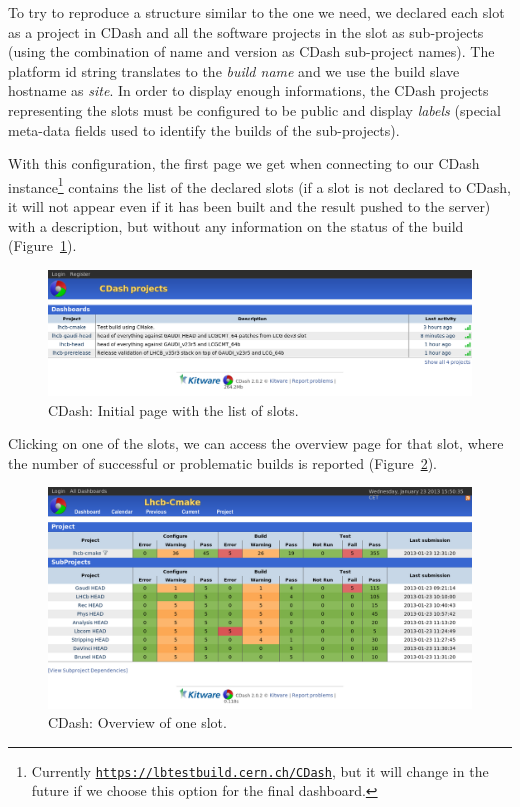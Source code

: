 \documentclass{lhcbnote}
\newcommand{\link}[2]{\href{#1}{#2}}
\newcommand{\urlLink}[1]{\link{#1}{\texttt{#1}}}
\begin{document}
To try to reproduce a structure similar to the one we need, we declared each
slot as a project in CDash and all the software projects in the slot as
sub-projects\cite{CMakeBook,CDashSubprojects} (using the combination of name and
version as CDash sub-project names).  The platform id string translates to the
\emph{build name} and we use the build slave hostname as \emph{site}.  In order
to display enough informations, the CDash projects representing the slots must
be configured to be public and display \emph{labels} (special meta-data fields
used to identify the builds of the sub-projects).

With this configuration, the first page we get when connecting to our CDash
instance\footnote{Currently \urlLink{https://lbtestbuild.cern.ch/CDash}, but it
will change in the future if we choose this option for the final dashboard.}
contains the list of the declared slots (if a slot is not declared to CDash, it
will not appear even if it has been built and the result pushed to the server)
with a description, but without any information on the status of the build
(Figure~\ref{fig:cdash-home}).

\begin{figure}[b]
  \begin{center}
    \includegraphics[width=15cm]{images/cdash-1}
  \end{center}
  \caption{CDash: Initial page with the list of slots.}
  \label{fig:cdash-home}
\end{figure}

Clicking on one of the slots, we can access the overview page for that slot,
where the number of successful or problematic builds is reported
(Figure~\ref{fig:cdash-slot}).

\begin{figure}
  \begin{center}
    \includegraphics[width=15cm]{images/cdash-2}
  \end{center}
  \caption{CDash: Overview of one slot.}
  \label{fig:cdash-slot}
\end{figure}
\end{document}
